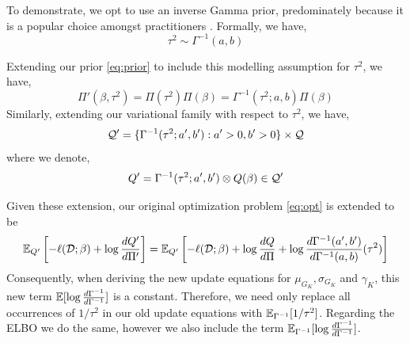 \documentclass[12pt]{article}
\begin{document}
To demonstrate, we opt to use an inverse Gamma prior, predominately because it is a popular choice amongst practitioners \citep{Browne2006}. Formally, we have,
\begin{equation}
    \tau^2 \sim \Gamma^{-1}(a, b)
\end{equation}

Extending our prior \eqref{eq:prior} to include this modelling assumption for $\tau^2$, we have,
\begin{equation}
    \Pi'(\beta, \tau^2) = \Pi(\tau^2) \Pi(\beta) = \Gamma^{-1}(\tau^2; a, b) \Pi(\beta)
\end{equation}
Similarly, extending our variational family with respect to $\tau^2$, we have,
\begin{equation}
    \mathcal{Q}' = \{ \Gamma^{-1}(\tau^2; a', b') : a' > 0, b' > 0 \} \times \mathcal{Q}
\end{equation}
where we denote,
\begin{equation}
    Q' = \Gamma^{-1}(\tau^2; a', b') \otimes Q(\beta) \in \mathcal{Q}' 
\end{equation}

Given these extension, our original optimization problem \eqref{eq:opt} is extended to be
\begin{equation}
    \mathbb{E}_{Q'} \left[ -\ell(\mathcal{D}; \beta) + \log \frac{dQ'}{d\Pi'} \right] = 
    \mathbb{E}_{Q'} \left[ -\ell(\mathcal{D}; \beta) + \log \frac{dQ}{d\Pi} + \log \frac{d\Gamma^{-1}(a', b')}{d \Gamma^{-1}(a, b)}(\tau^2)\right]
\end{equation}
Consequently, when deriving the new update equations for $\mu_{G_K}, \sigma_{G_K}$ and $\gamma_K$, this new term $ \mathbb{E} [ \log \frac{d\Gamma^{-1}}{d\Gamma^{-1}} ] $ is a constant. Therefore, we need only replace all occurrences of $1/\tau^2$ in our old update equations with $\mathbb{E}_{\Gamma^{-1}} [ 1 / \tau^2 ] $. Regarding the ELBO we do the same, however we also include the term $ \mathbb{E}_{\Gamma^{-1}} [ \log \frac{d\Gamma^{-1}}{d\Gamma^{-1}}] $.
\end{document}
